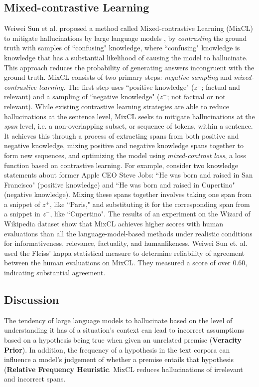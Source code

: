 \documentclass[letterpaper,12pt]{article}
\begin{document}
\subsection{Mixed-contrastive Learning}
\label{sec:mixcl}
Weiwei Sun et al. proposed a method called Mixed-contrastive Learning (MixCL) to mitigate hallucinations by large language models \cite{mixcl}, by \textit{contrasting} the ground truth with samples of ``confusing" knowledge, where ``confusing" knowledge is knowledge that has a substantial likelihood of causing the model to hallucinate. This approach reduces the probability of generating answers incongruent with the ground truth. MixCL consists of two primary steps: \textit{negative sampling} and \textit{mixed-contrastive learning}. The first step uses ``positive knowledge" ($z^+$; factual and relevant) and a sampling of ``negative knowledge" ($z^-$; not factual or not relevant). While existing contrastive learning strategies are able to reduce hallucinations at the sentence level, MixCL seeks to mitigate hallucinations at the \textit{span} level, i.e. a non-overlapping subset, or sequence of tokens, within a sentence. It achieves this through a process of extracting spans from both positive and negative knowledge, mixing positive and negative knowledge spans together to form new sequences, and optimizing the model using \textit{mixed-contrast loss}, a loss function based on contrastive learning. For example, consider two knowledge statements about former Apple CEO Steve Jobs: ``He was born and raised in San Francisco" (positive knowledge) and ``He was born and raised in Cupertino" (negative knowledge). Mixing these spans together involves taking one span from a snippet of $z^+$, like ``Paris," and substituting it for the corresponding span from a snippet in $z^-$, like ``Cupertino". The results of an experiment on the Wizard of Wikipedia dataset show that MixCL achieves higher scores with human evaluations than all the language-model-based methods under realistic conditions for informativeness, relevance, factuality, and humanlikeness. Weiwei Sun et. al. used the Fleiss' kappa statistical measure to determine reliability of agreement between the human evaluations on MixCL. They measured a score of over 0.60, indicating substantial agreement.

\subsection{Discussion}
The tendency of large language models to hallucinate based on the level of understanding it has of a situation's context can lead to incorrect assumptions based on a hypothesis being true when given an unrelated premise (\textbf{Veracity Prior}). In addition, the frequency of a hypothesis in the text corpora can influence a model's judgement of whether a premise entails that hypothesis (\textbf{Relative Frequency Heuristic}. MixCL reduces hallucinations of irrelevant and incorrect spans.
\end{document}
